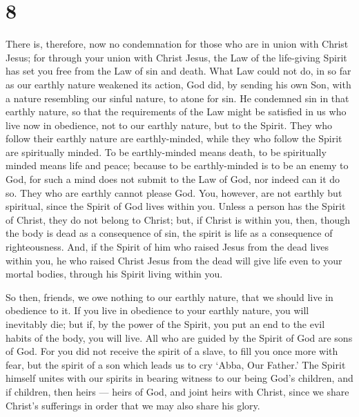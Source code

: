 \hypertarget{section-7}{%
\section{8}\label{section-7}}

 There is, therefore, now no condemnation for those who are
in union with Christ Jesus;  for through your union with
Christ Jesus, the Law of the life-giving Spirit has set you free from
the Law of sin and death.  What Law could not do, in so far
as our earthly nature weakened its action, God did, by sending his own
Son, with a nature resembling our sinful nature, to atone for sin. He
condemned sin in that earthly nature,  so that the
requirements of the Law might be satisfied in us who live now in
obedience, not to our earthly nature, but to the Spirit. 
They who follow their earthly nature are earthly-minded, while they who
follow the Spirit are spiritually minded.  To be
earthly-minded means death, to be spiritually minded means life and
peace;  because to be earthly-minded is to be an enemy to
God, for such a mind does not submit to the Law of God, nor indeed can
it do so.  They who are earthly cannot please God.
 You, however, are not earthly but spiritual, since the
Spirit of God lives within you. Unless a person has the Spirit of
Christ, they do not belong to Christ;  but, if Christ is
within you, then, though the body is dead as a consequence of sin, the
spirit is life as a consequence of righteousness.  And, if
the Spirit of him who raised Jesus from the dead lives within you, he
who raised Christ Jesus from the dead will give life even to your mortal
bodies, through his Spirit living within you.

 So then, friends, we owe nothing to our earthly nature,
that we should live in obedience to it.  If you live in
obedience to your earthly nature, you will inevitably die; but if, by
the power of the Spirit, you put an end to the evil habits of the body,
you will live.  All who are guided by the Spirit of God are
sons of God.  For you did not receive the spirit of a
slave, to fill you once more with fear, but the spirit of a son which
leads us to cry `Abba, Our Father.'  The Spirit himself
unites with our spirits in bearing witness to our being God's children,
 and if children, then heirs --- heirs of God, and joint
heirs with Christ, since we share Christ's sufferings in order that we
may also share his glory.


